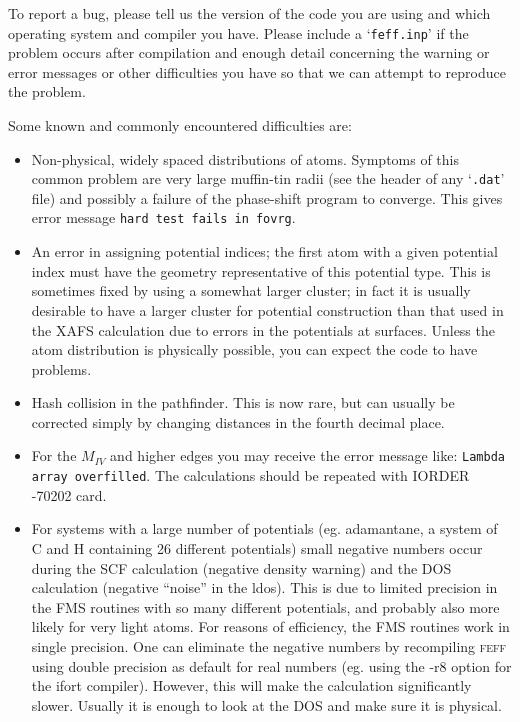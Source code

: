 \documentclass[11pt,oneside]{report} %
\newcommand{\program}[1]{\textsc{#1}}
\newcommand{\feff}{\program{feff}}
\newcommand{\file}[1]{`\texttt{#1}'}
\begin{document}
\begin{latexonly}
To  report a bug, please tell us the version of the code you are using
and which operating system and compiler you have. Please include a
\file{feff.inp} if the problem occurs after compilation
and enough detail concerning the warning or error messages or
other difficulties you have so that we can attempt to reproduce the problem.

Some known and commonly encountered difficulties are:
\begin{itemize}
\item Non-physical, widely spaced distributions of atoms. Symptoms of
  this common problem are very large muffin-tin radii (see the header
  of any \file{.dat} file) and possibly a failure of the phase-shift
  program to converge. This gives error message \texttt{hard test
    fails in fovrg}.
\item An error in assigning potential indices; the first atom with a
  given potential index must have the geometry representative of this
  potential type. This is sometimes fixed by using a somewhat larger
  cluster; in fact it is usually desirable to have a larger cluster
  for potential construction than that used in the XAFS calculation
  due to errors in the potentials at surfaces. Unless the atom
  distribution is physically possible, you can expect the code to have
  problems.
\item Hash collision in the pathfinder. This is now rare, but can
  usually be corrected simply by changing distances in the fourth
  decimal place.
\item For the $M_{\mathit{IV}}$ and higher edges you may receive the
  error message like: \texttt{Lambda array overfilled}. The
  calculations should be repeated with IORDER -70202 card.
\item For systems with a large number of potentials (eg. adamantane,
  a system of C and H containing 26 different potentials) small negative numbers
  occur during the SCF calculation (negative density warning) and the DOS
  calculation (negative "`noise"' in the ldos).  This is due to limited precision 
  in the FMS routines with so many different potentials, and probably also more likely
  for very light atoms.  For reasons of efficiency, the FMS routines work in single
  precision.  One can eliminate the negative numbers by recompiling {\feff} using
  double precision as default for real numbers (eg. using the -r8 option for the ifort
  compiler).  However, this will make the calculation significantly slower.  Usually it is enough to look at the DOS and make sure it is physical.
\end{itemize}

\end{latexonly} %
\end{document}
